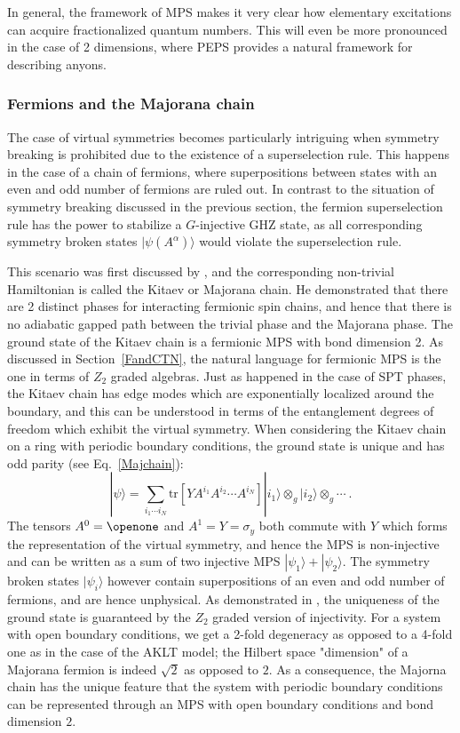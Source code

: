 \documentclass[rmp,aps,reprint,superscriptaddress,nobalancelastpage]{revtex4-1}
\newcommand{\tr}{\mathrm{tr}}
\begin{document}
In general, the framework of MPS makes it very clear how elementary excitations can acquire fractionalized quantum numbers. This will even be more pronounced in the case of 2 dimensions, where PEPS provides a natural framework for describing anyons.


\subsubsection{Fermions and the Majorana chain\label{sec:3:fermions}}

The case of virtual symmetries becomes particularly intriguing when symmetry breaking is prohibited due to the existence of a superselection rule. This happens in the case of a chain of fermions, where superpositions between states with an even and odd number of fermions are ruled out. In contrast to the situation of symmetry breaking discussed in the previous section, the fermion superselection rule has the power to stabilize a $G$-injective GHZ state,  as all corresponding symmetry broken states $|\psi\left(A^\alpha\right)\rangle$ would violate the superselection rule.

This scenario was first discussed by \citet{kitaev:majorana-chain}, and the corresponding non-trivial Hamiltonian is called the Kitaev or Majorana chain. He demonstrated that there are 2 distinct phases for interacting fermionic spin chains, and hence that there is no adiabatic gapped path between the trivial phase and the Majorana phase. The ground state of the Kitaev chain is a fermionic MPS with bond dimension 2. As discussed in Section~\ref{FandCTN}, the natural language for fermionic MPS is the one in terms of $Z_2$ graded algebras. Just as happened in the case of SPT phases, the Kitaev chain has edge modes which are exponentially localized around the boundary, and this can be understood in terms of the entanglement degrees of freedom which exhibit the virtual symmetry.  When considering the Kitaev chain on a ring with periodic boundary conditions, the ground state is unique and has odd parity (see Eq.~\eqref{Majchain}):
\begin{equation}\label{eq:kitaev-chain-mps}
    |\psi\rangle=\sum_{i_1\cdots i_N}\tr\left[{YA^{i_1}A^{i_2}\cdots A^{i_N}}\right]|i_1\rangle\otimes_g|i_2\rangle\otimes_g\cdots
    \ .
\end{equation}
The tensors $A^0=\openone$ and $A^1=Y=\sigma_y$ both commute with  $Y$
which forms the representation of the virtual symmetry, and hence the MPS
is non-injective and can be written as a sum of two injective MPS
$|\psi_1\rangle+|\psi_2\rangle$. The symmetry broken states
$|\psi_i\rangle$ however contain  superpositions of an even and odd number
of fermions, and are hence unphysical.  As demonstrated in
\citet{bultinck:fermionic-mps-phases}, the uniqueness of the ground state is guaranteed by the $Z_2$ graded version of injectivity. For a system with open boundary conditions, we get a 2-fold degeneracy as opposed to a 4-fold one as in the case of the AKLT model; the Hilbert space "dimension" of a Majorana fermion is indeed $\sqrt{2}$ as opposed to $2$. As a consequence, the Majorna chain has the unique feature that the system with periodic boundary conditions can be represented through an MPS with open boundary conditions and bond dimension $2$.
\end{document}
